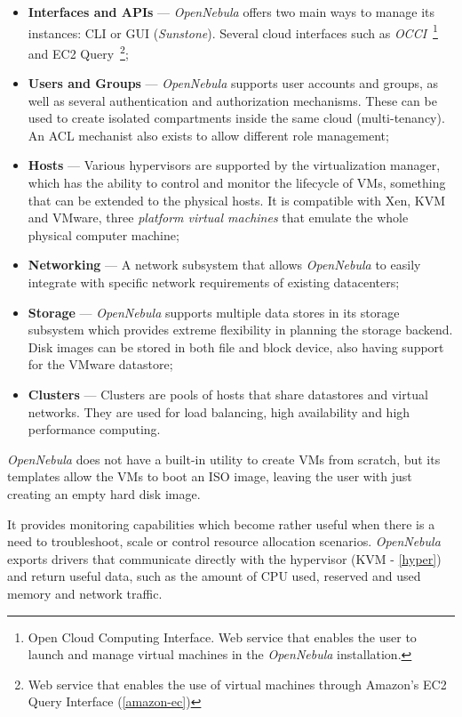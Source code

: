 \begin{itemize}
\item \textbf{Interfaces and APIs} --- \textit{OpenNebula} offers two main ways to manage its instances: CLI or GUI (\textit{Sunstone}). Several cloud interfaces such as \textit{OCCI}~\footnote{Open Cloud Computing Interface. Web service that enables the user to launch and manage virtual machines in the \textit{OpenNebula} installation.} and EC2 Query~\footnote{Web service that enables the use of virtual machines through Amazon's EC2 Query Interface (\ref{amazon-ec})};
\item \textbf{Users and Groups} --- \textit{OpenNebula} supports user accounts and groups, as well as several authentication and authorization mechanisms. These can be used to create isolated compartments inside the same cloud (multi-tenancy). An ACL mechanist also exists to allow different role management;
\item \textbf{Hosts} --- Various hypervisors are supported by the virtualization manager, which has the ability to control and monitor the lifecycle of VMs, something that can be extended to the physical hosts. It is compatible with Xen, KVM and VMware, three \textit{platform virtual machines} that emulate the whole physical computer machine;
\item \textbf{Networking} --- A network subsystem that allows \textit{OpenNebula} to easily integrate with specific network requirements of existing datacenters;
\item \textbf{Storage} --- \textit{OpenNebula} supports multiple data stores in its storage subsystem which provides extreme flexibility in planning the storage backend. Disk images can be stored in both file and block device, also having support for the VMware datastore;
\item \textbf{Clusters} --- Clusters are pools of hosts that share datastores and virtual networks. They are used for load balancing, high availability and high performance computing.
\end{itemize}
\textit{OpenNebula} does not have a built-in utility to create VMs from scratch, but its templates allow the VMs to boot an ISO image, leaving the user with just creating an empty hard disk image.

It provides monitoring capabilities which become rather useful when there is a need to troubleshoot, scale or control resource allocation scenarios. \textit{OpenNebula} exports drivers that communicate directly with the hypervisor (KVM - \ref{hyper}) and return useful data, such as the amount of CPU used, reserved and used memory and network traffic.\cite{open-clouds}

